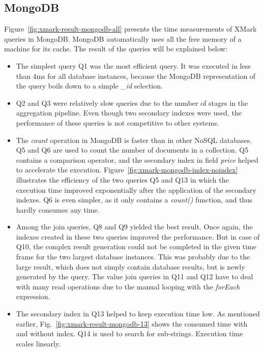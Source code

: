 \subsection{MongoDB}
Figure~\ref{fig:xmark-result-mongodb-all} presents the time measurements of XMark queries in MongoDB. MongoDB automatically uses all the free memory of a machine for its cache. The result of the queries will be explained below:
\begin{itemize}
\item The simplest query Q1 was the most efficient query. It was executed in less than 4ms for all database instances, because the MongoDB representation of the query boils down to a simple \textit{\_id} selection.
\item Q2 and Q3 were relatively slow queries due to the number of stages in the aggregation pipeline. Even though two secondary indexes were used, the performance of these queries is not competitive to other systems. 
\item The \textit{count} operation in MongoDB is faster than in other NoSQL databases. Q5 and Q6 are used to count the number of documents in a collection. Q5 contains a comparison operator, and the secondary index in field \textit{price} helped to accelerate the execution. Figure~\ref{fig:xmark-mongodb-index-noindex} illustrates the efficiency of the two queries Q5 and Q13 in which the execution time improved exponentially after the application of the secondary indexes. Q6 is even simpler, as it only contains a \textit{count()} function, and thus hardly consumes any time.

\item Among the join queries, Q8 and Q9 yielded the best result. Once again, the indexes created in these two queries improved the performance. 
But in case of Q10, the complex result generation could not be completed in the given time frame for the two largest database instances. This was probably due to the large result, which does not simply contain database results, but is newly generated by the query. The value join queries in Q11 and Q12 have to deal with many read operations due to the manual looping with the \textit{forEach} expression.

\item The secondary index in Q13 helped to keep execution time low. As mentioned earlier, Fig.~\ref{fig:xmark-result-mongodb-13} shows the consumed time with and without index. Q14 is used to search for sub-strings. Execution time scales linearly.


\end{itemize}
